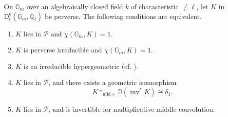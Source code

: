 On \(\mathbb{G}_m\) over an algebraically closed field \(k\) of characteristic
\(\ne\ell\), let \(K\) in
\(\mathrm{D}^b_c(\mathbb{G}_m,\overline{\mathbb{Q}}_\ell)\) be perverse. The
following conditions are equivalent.
\begin{enumerate}[label=(\arabic*)]
\item \(K\) lies in \(\mathcal{P}\) and \(\chi(\mathbb{G}_m,K)=1\).
\item \(K\) is perverse irreducible and \(\chi(\mathbb{G}_m,K)=1\).
\item \(K\) is an irreducible hypergeometric (cf.
\cite[3.5.4 and 8.5.3]{Ka-ESDE}).
\item \(K\) lies in \(\mathcal{P}\), and there exists a geometric isomorphism
\[
  K*_{\mathrm{mid}\times}\mathbb{D}(\operatorname{inv}^*K)\cong\delta_1.
\]
\item \(K\) lies in \(\mathcal{P}\), and is invertible for multiplicative
middle convolution.
\end{enumerate}
